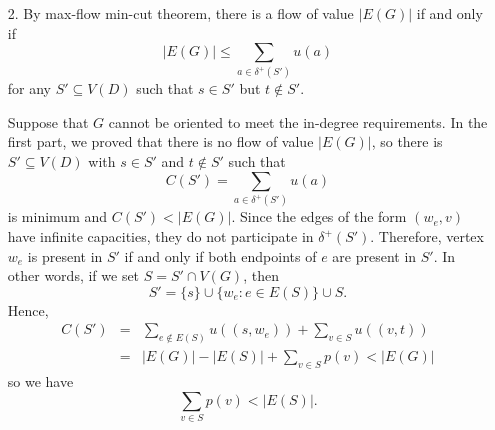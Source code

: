 \documentclass[12pt]{article}
\begin{document}
\begin{enumerate}
\begin{itemize}
\textbf{Claim.} There exists an orientation meeting the in-degree requirement if and only if the value of a maximum-flow is equal to $|E(G)|$.

\begin{proof}
Given any orientation of $E(G)$, let us define a valuation $x : E(D) \to \Z$ so that
\begin{itemize}
\item for any edge $e = \{u, v\} \in E(G)$ we have $x((w_e, u)) = 1$ and $x((w_e, v)) = 0$ if $e$ is oriented as $(v, u)$ or $x((w_e, u))=0$ and $x((w_e,v))=1$ if $e$ is oriented as $(u, v)$,
\item $x((s, w_e)) = 1$ for all $e \in E(G)$, and
\item $x((v, t)) = \sum_{e\in E(G):v \in e} x((w_e,v))$ for all $v \in V(G)$.
\end{itemize}
Note that $x$ satisfies flow conservation constraints by definition. Furthermore, $x((v, t))$ is exactly the in-degree of $v$ in the orientation. It implies that if the given orientation meets the in-degree requirement, then $x$ is a feasible flow with the value $|E(G)|$, which is maximum.

To prove the converse, let $x : E(D) \to \Z$ be an integral flow of value $|E(G)|$. Note that
$$
|x| = \sum_{e \in E(G)} x((s, w_e)) \leq \sum_{e \in E(G)} u((s, w_e)) = |E(G)|,
$$
so we must have $x((s, w_e)) = 1$ for all $e \in E(G)$. Furthermore, since $x$ is integral, we have $x((w_e, u))$ or $x((w_e, v))$ equal to 1 where $u$ and $v$ are endpoints of $e$. Now orient $e$ as $(u, v)$ if $x((w_e, v)) = 1$ or $(v, u)$ if $x((w_e, u)) = 1$. In this orientation the in-degree of a vertex $v \in V(G)$ is equal to
$$
\sum_{e: v \in e} x((w_e,v)) = x((v, t)),
$$
which is at most $u((v,t)) = p(v)$ as desired.

\end{proof}

\item[2.] By max-flow min-cut theorem, there is a flow of value $|E(G)|$ if and only if
$$
|E(G)| \leq \sum_{a \in \delta^{+}(S')} u(a)
$$
for any $S' \subseteq V(D)$ such that $s \in S'$ but $t \not\in S'$.

Suppose that $G$ cannot be oriented to meet the in-degree requirements. In the first part, we proved that there is no flow of value $|E(G)|$, so there is $S' \subseteq V(D)$ with $s \in S'$ and $t \not\in S'$ such that
$$
C(S') = \sum_{a \in \delta^{+}(S')} u(a)
$$
is minimum and $C(S') < |E(G)|$.
Since the edges of the form $(w_e, v)$ have infinite capacities, they do not participate in $\delta^{+}(S')$. Therefore, vertex $w_e$ is present in $S'$ if and only if both endpoints of $e$ are present in $S'$. In other words, if we set $S = S' \cap V(G)$, then
$$
S' = \{s\} \cup \{w_e: e\in E(S)\} \cup S.
$$
Hence,
\begin{eqnarray*}
C(S') &=& \sum_{e \not\in E(S)} u((s,w_e)) + \sum_{v \in S} u((v, t)) \\
&=& |E(G)|-|E(S)| + \sum_{v \in S} p(v) < |E(G)|
\end{eqnarray*}
so we have
$$
\sum_{v \in S} p(v) < |E(S)|.
$$


\end{itemize}
\end{enumerate}
\end{document}
